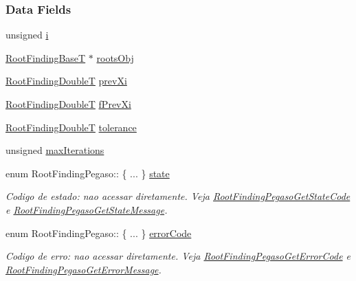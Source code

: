 \subsubsection*{Data Fields}
\begin{CompactItemize}
\item 
unsigned \hyperlink{structRootFindingPegaso_5eb3cedde0b6d796aa01d2a85f318901}{i}
\item 
\hyperlink{structRootFindingBase}{RootFindingBaseT} $\ast$ \hyperlink{structRootFindingPegaso_ec361d173e8df28abcec266eae70034d}{rootsObj}
\item 
\hyperlink{RootFindingCommon_8h_a296fe63994e03408c4ad62794d472e9}{RootFindingDoubleT} \hyperlink{structRootFindingPegaso_2f24143722208254c69d9c7ec625d1b7}{prevXi}
\item 
\hyperlink{RootFindingCommon_8h_a296fe63994e03408c4ad62794d472e9}{RootFindingDoubleT} \hyperlink{structRootFindingPegaso_92c1b802760bd0cf4be51faddc74d662}{fPrevXi}
\item 
\hyperlink{RootFindingCommon_8h_a296fe63994e03408c4ad62794d472e9}{RootFindingDoubleT} \hyperlink{structRootFindingPegaso_a52c433bf87d623c6079a6bed04a2ca1}{tolerance}
\item 
unsigned \hyperlink{structRootFindingPegaso_f201e2c5a08bd0469255e21783f93fff}{maxIterations}
\item 
enum RootFindingPegaso:: \{ ... \}  \hyperlink{structRootFindingPegaso_e02d9e369d5ea543206b764a80256ae3}{state}
\begin{CompactList}\small\item\em Codigo de estado: nao acessar diretamente. Veja \hyperlink{group____pegaso_g83892750b865aa977fcdba83922ad6fb}{RootFindingPegasoGetStateCode} e \hyperlink{group____pegaso_g2328683ae067772b11e3127fe800448d}{RootFindingPegasoGetStateMessage}. \item\end{CompactList}\item 
enum RootFindingPegaso:: \{ ... \}  \hyperlink{structRootFindingPegaso_0b6d561b18770d1e472e1f69c143ee96}{errorCode}
\begin{CompactList}\small\item\em Codigo de erro: nao acessar diretamente. Veja \hyperlink{group____pegaso_g6b27d39dab4f225185c07eb6fbb22ff9}{RootFindingPegasoGetErrorCode} e \hyperlink{group____pegaso_g4d0abd516b71e0462de1b22ce896b87a}{RootFindingPegasoGetErrorMessage}. \item\end{CompactList}\end{CompactItemize}


